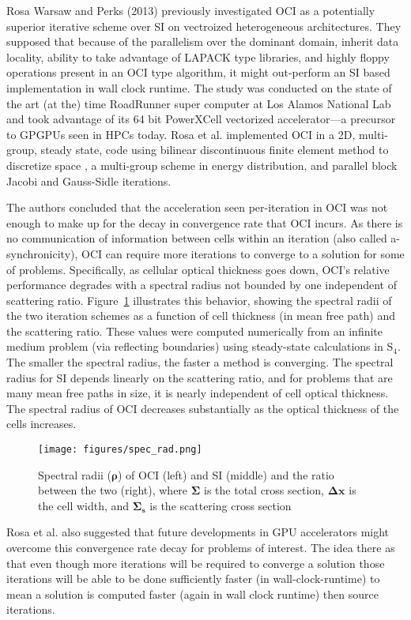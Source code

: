 Rosa Warsaw and Perks (2013) \cite{rosa_cellwise_2013} previously investigated OCI as a potentially superior iterative scheme over SI on vectroized heterogeneous architectures.
They supposed that because of the parallelism over the dominant domain, inherit data locality, ability to take advantage of LAPACK type libraries, and highly floppy operations present in an OCI type algorithm, it might out-perform an SI based implementation in wall clock runtime.
The study was conducted on the state of the art (at the) time RoadRunner super computer at Los Alamos National Lab and took advantage of its 64 bit PowerXCell vectorized accelerator---a precursor to GPGPUs seen in HPCs today.
Rosa et al. implemented OCI in a 2D, multi-group, steady state, code using bilinear discontinuous finite element method to discretize space \cite{tsa_2d2007rosa}, a multi-group scheme in energy distribution, and parallel block Jacobi and Gauss-Sidle iterations.

The authors concluded that the acceleration seen per-iteration in OCI was not enough to make up for the decay in convergence rate that OCI incurs.
As there is no communication of information between cells within an iteration (also called a-synchronicity), OCI can require more iterations to converge to a solution for some of problems. 
Specifically, as cellular optical thickness goes down, OCI's relative performance degrades with a spectral radius not bounded by one independent of scattering ratio.
Figure~\ref{fig:specrad} illustrates this behavior, showing the spectral radii of the two iteration schemes as a function of cell thickness (in mean free path) and the scattering ratio.
These values were computed numerically from an infinite medium problem (via reflecting boundaries) using steady-state calculations in S$_4$. 
The smaller the spectral radius, the faster a method is converging.
The spectral radius for SI depends linearly on the scattering ratio, and for problems that are many mean free paths in size, it is nearly independent of cell optical thickness. 
The spectral radius of OCI decreases substantially as the optical thickness of the cells increases.
\begin{figure}[!htb]
    \centering
    \texttt{[image: figures/spec\_rad.png]}
    \caption{Spectral radii ($\boldsymbol{\rho}$) of OCI (left) and SI (middle) and the ratio between the two (right), where $\boldsymbol{\Sigma}$ is the total cross section, $\boldsymbol{\Delta x}$ is the cell width, and $\boldsymbol{\Sigma_s}$ is the scattering cross section}
    \label{fig:specrad}
  \end{figure}
Rosa et al. also suggested that future developments in GPU accelerators might overcome this convergence rate decay for problems of interest.
The idea there as that even though more iterations will be required to converge a solution those iterations will be able to be done sufficiently faster (in wall-clock-runtime) to mean a solution is computed faster (again in wall clock runtime) then source iterations.

